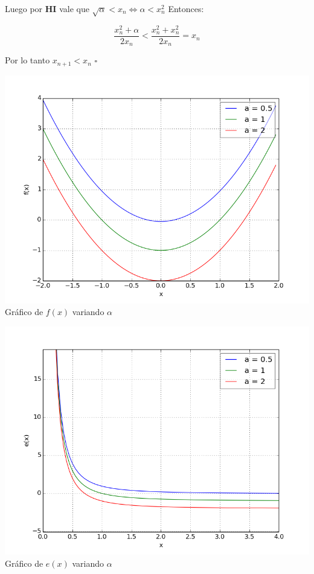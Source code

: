 Luego por {\bf HI} vale que $\sqrt{\alpha} < x_n \iff \alpha < x_n^2 $ Entonces:

\begin{displaymath}
    \frac{x_n^2 + \alpha}{2x_n} < \frac{x_n^2 + x_n^2}{2x_n} = x_n
\end{displaymath}

Por lo tanto $x_{n + 1} < x_n$ $\square$


\begin{center}
\includegraphics[scale=0.5]{graficos/f(x).png}\\
Gráfico de $f(x)$ variando $\alpha$
\end{center}

\begin{center}
\includegraphics[scale=0.5]{graficos/e(x).png}\\
Gráfico de $e(x)$ variando $\alpha$
\end{center}
